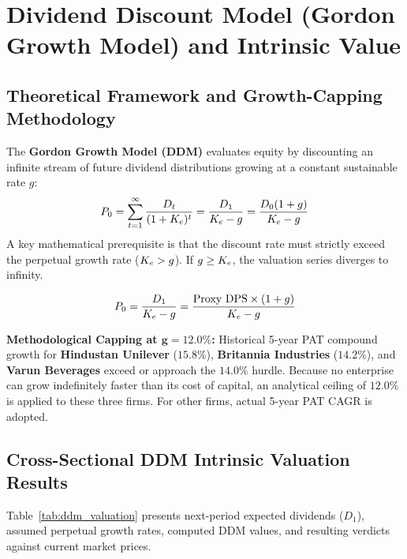 
\clearpage
\section[Dividend Discount Model]{Dividend Discount Model (Gordon Growth Model) and Intrinsic Value}

\subsection{Theoretical Framework and Growth-Capping Methodology}
The \textbf{Gordon Growth Model (DDM)} evaluates equity by discounting an infinite stream of future dividend distributions growing at a constant sustainable rate $g$:
\begin{equation}
    P_0 = \sum_{t=1}^{\infty} \frac{D_t}{(1 + K_e)^t} = \frac{D_1}{K_e - g} = \frac{D_0 (1 + g)}{K_e - g}
\end{equation}
A key mathematical prerequisite is that the discount rate must strictly exceed the perpetual growth rate ($K_e > g$). If $g \ge K_e$, the valuation series diverges to infinity.

\begin{formulabox}
\begin{equation}
    P_0 = \frac{D_1}{K_e - g} = \frac{\text{Proxy DPS} \times (1 + g)}{K_e - g}
\end{equation}
\end{formulabox}

\textbf{Methodological Capping at $\bm{g = 12.0\%}$:} Historical 5-year PAT compound growth for \textbf{Hindustan Unilever} ($15.8\%$), \textbf{Britannia Industries} ($14.2\%$), and \textbf{Varun Beverages} exceed or approach the $14.0\%$ hurdle. Because no enterprise can grow indefinitely faster than its cost of capital, an analytical ceiling of \textbf{$\bm{12.0\%}$} is applied to these three firms. For other firms, actual 5-year PAT CAGR is adopted.

\subsection{Cross-Sectional DDM Intrinsic Valuation Results}
Table~\ref{tab:ddm_valuation} presents next-period expected dividends ($D_1$), assumed perpetual growth rates, computed DDM values, and resulting verdicts against current market prices.


